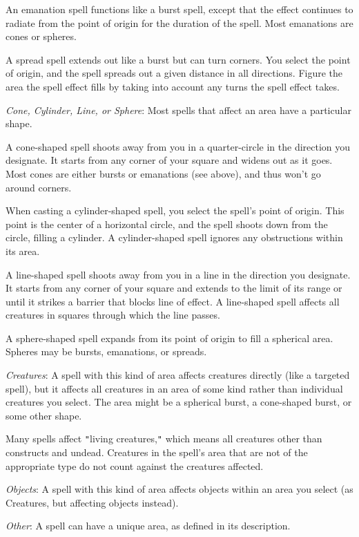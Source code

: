 An emanation spell functions like a burst spell, except that the effect continues to radiate from the point of origin for the duration of the spell. Most emanations are cones or spheres.
				
A spread spell extends out like a burst but can turn corners. You select the point of origin, and the spell spreads out a given distance in all directions. Figure the area the spell effect fills by taking into account any turns the spell effect takes.
				
\textit{Cone, Cylinder, Line, or Sphere}: Most spells that affect an area have a particular shape.
				
A cone-shaped spell shoots away from you in a quarter-circle in the direction you designate. It starts from any corner of your square and widens out as it goes. Most cones are either bursts or emanations (see above), and thus won't go around corners.
				
When casting a cylinder-shaped spell, you select the spell's point of origin. This point is the center of a horizontal circle, and the spell shoots down from the circle, filling a cylinder. A cylinder-shaped spell ignores any obstructions within its area.
				
A line-shaped spell shoots away from you in a line in the direction you designate. It starts from any corner of your square and extends to the limit of its range or until it strikes a barrier that blocks line of effect. A line-shaped spell affects all creatures in squares through which the line passes.
				
A sphere-shaped spell expands from its point of origin to fill a spherical area. Spheres may be bursts, emanations, or spreads.
				
\textit{Creatures}: A spell with this kind of area affects creatures directly (like a targeted spell), but it affects all creatures in an area of some kind rather than individual creatures you select. The area might be a spherical burst, a cone-shaped burst, or some other shape.
				
Many spells affect \texttt{{}"{}}living creatures,\texttt{{}"{}} which means all creatures other than constructs and undead. Creatures in the spell's area that are not of the appropriate type do not count against the creatures affected.
				
\textit{Objects}: A spell with this kind of area affects objects within an area you select (as Creatures, but affecting objects instead).
				
\textit{Other}: A spell can have a unique area, as defined in its description.
				
